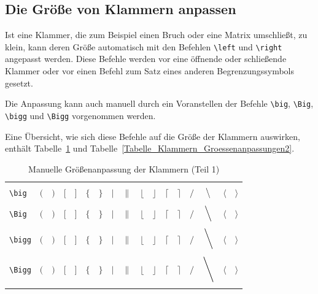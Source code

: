 \documentclass[a4paper,10pt,twoside]{scrbook}
\begin{document}
{\subsection{Die Größe von Klammern anpassen}

Ist eine Klammer, die zum Beispiel einen Bruch oder eine Matrix umschließt, zu klein, kann deren 
Größe automatisch mit den Befehlen 
\verb!\left! und 
\verb!\right! 
angepasst werden. Diese Befehle werden vor eine öffnende oder schließende Klammer oder vor einen Befehl 
zum Satz eines anderen Begrenzungssymbols gesetzt.

Die Anpassung kann auch manuell durch ein Voranstellen der Befehle 
\verb!\big!,  
\verb!\Big!,
\verb!\bigg! und  
\verb!\Bigg! vorgenommen werden.

Eine Übersicht, wie sich 
diese Befehle auf die Größe der Klammern 
auswirken, enthält Tabelle~\ref{Tabelle_Klammern_Groessenanpassungen1} und Tabelle~\ref{Tabelle_Klammern_Groessenanpassungen2}.


\begin{table}[h!tb]
\centering
\caption{Manuelle Größenanpassung der Klammern (Teil 1)}
\label{Tabelle_Klammern_Groessenanpassungen1}       %
\begin{tabular}{lcccccccccccccccc}
\hline
& & & & & & & & & & & & & & & &  \\
\texttt{\textbackslash big} & $\big($ & $\big)$ & $\big[$ & $\big]$ & 
$\big\{$ & $\big\}$ & $\big|$ & $\big\|$ & 
$\big\lfloor$ & $\big\rfloor$ & $\big\lceil$ & $\big\rceil$ &
$\big/$ & $\big\backslash$ & $\big\langle$ & $\big\rangle$  \\
& & & & & & & & & & & & & & & &  \\
\texttt{\textbackslash Big} & $\Big($ & $\Big)$ & $\Big[$ & $\Big]$ & 
$\Big\{$ & $\Big\}$ & $\Big|$ & $\Big\|$ & 
$\Big\lfloor$ & $\Big\rfloor$ & $\Big\lceil$ & $\Big\rceil$ &
$\Big/$ & $\Big\backslash$ & $\Big\langle$ & $\Big\rangle$  \\
& & & & & & & & & & & & & & & &  \\
\texttt{\textbackslash bigg} & $\bigg($ & $\bigg)$ & $\bigg[$ & $\bigg]$ & 
$\bigg\{$ & $\bigg\}$ & $\bigg|$ & $\bigg\|$ & 
$\bigg\lfloor$ & $\bigg\rfloor$ & $\bigg\lceil$ & $\bigg\rceil$ &
$\bigg/$ & $\bigg\backslash$ & $\bigg\langle$ & $\bigg\rangle$ \\
& & & & & & & & & & & & & & & &  \\
\texttt{\textbackslash Bigg} & $\Bigg($ & $\Bigg)$ & $\Bigg[$ & $\Bigg]$ & 
$\Bigg\{$ & $\Bigg\}$ & $\Bigg|$ & $\Bigg\|$ & 
$\Bigg\lfloor$ & $\Bigg\rfloor$ & $\Bigg\lceil$ & $\Bigg\rceil$ &
$\Bigg/$ & $\Bigg\backslash$ & $\Bigg\langle$ & $\Bigg\rangle$  \\
& & & & & & & & & & & & & & & &  \\
\hline
\end{tabular}
\end{table}

}
\end{document}
